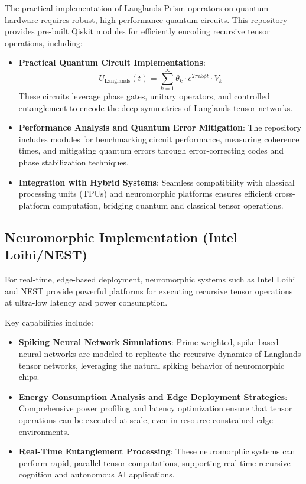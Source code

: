 \documentclass[11pt]{article}
\begin{document}
The practical implementation of Langlands Prism operators on quantum hardware requires robust, high-performance quantum circuits. This repository provides pre-built Qiskit modules for efficiently encoding recursive tensor operations, including:

\begin{itemize}
    \item \textbf{Practical Quantum Circuit Implementations}:
    \[
    U_{\text{Langlands}}(t) = \sum_{k=1}^\infty \theta_k \cdot e^{2\pi i k \phi t} \cdot V_k
    \]
    These circuits leverage phase gates, unitary operators, and controlled entanglement to encode the deep symmetries of Langlands tensor networks.

    \item \textbf{Performance Analysis and Quantum Error Mitigation}:
    The repository includes modules for benchmarking circuit performance, measuring coherence times, and mitigating quantum errors through error-correcting codes and phase stabilization techniques.
    
    \item \textbf{Integration with Hybrid Systems}:
    Seamless compatibility with classical processing units (TPUs) and neuromorphic platforms ensures efficient cross-platform computation, bridging quantum and classical tensor operations.
\end{itemize}

\subsection{Neuromorphic Implementation (Intel Loihi/NEST)}

For real-time, edge-based deployment, neuromorphic systems such as Intel Loihi and NEST provide powerful platforms for executing recursive tensor operations at ultra-low latency and power consumption.

Key capabilities include:

\begin{itemize}
    \item \textbf{Spiking Neural Network Simulations}:
    Prime-weighted, spike-based neural networks are modeled to replicate the recursive dynamics of Langlands tensor networks, leveraging the natural spiking behavior of neuromorphic chips.

    \item \textbf{Energy Consumption Analysis and Edge Deployment Strategies}:
    Comprehensive power profiling and latency optimization ensure that tensor operations can be executed at scale, even in resource-constrained edge environments.

    \item \textbf{Real-Time Entanglement Processing}:
    These neuromorphic systems can perform rapid, parallel tensor computations, supporting real-time recursive cognition and autonomous AI applications.
\end{itemize}
\end{document}
